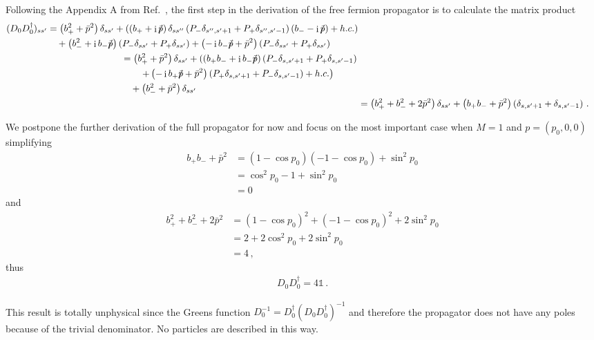 \documentclass[a4paper]{article}
\DeclareMathOperator{\im}{i}
\begin{document}
	Following the Appendix A from Ref.~\cite{hands_thirring2016}, the first step in the derivation of the free fermion propagator is to calculate the matrix product
	\begin{align}
		\begin{split}
			(D_0D_0^\dagger)_{ss'} &= \left(b_+^2+{\bar p}^2\right)\delta_{ss'}
			+ \left(\left(b_+ + \im \slashed{\bar p}\right)\delta_{ss''} \left(P_-\delta_{s'',s'+1} + P_+\delta_{s'',s'-1}\right)\left(b_- - \im \slashed{\bar p}\right) + h.c.\right)\\
			&\quad + \left(b_-^2+\im b_-\slashed{\bar p}\right)\left(P_-\delta_{ss'}+P_+\delta_{ss'}\right) + \left(-\im b_-\slashed{\bar p}+{\bar p}^2\right)\left(P_-\delta_{ss'}+P_+\delta_{ss'}\right)
		\end{split}\\
		\begin{split}
			&= \left(b_+^2+{\bar p}^2\right)\delta_{ss'}
			+ \left(\left(b_+b_- + \im b_- \slashed{\bar p}\right)\left(P_-\delta_{s,s'+1} + P_+\delta_{s,s'-1}\right)\right.\\
			&\qquad \left.+ \left(- \im b_+ \slashed{\bar p} + {\bar p}^2\right)\left(P_+\delta_{s,s'+1} + P_-\delta_{s,s'-1}\right) + h.c.\right)\\
			&\quad + \left(b_-^2+{\bar p}^2\right)\delta_{ss'}
		\end{split}\\
		&= \left(b_+^2+b_-^2+2\bar p^2\right)\delta_{ss'} + \left(b_+b_- + {\bar p}^2\right)\left(\delta_{s,s'+1} + \delta_{s,s'-1}\right)\,.
	\end{align}

	We postpone the further derivation of the full propagator for now and focus on the most important case when $M=1$ and $p=(p_0,0,0)$ simplifying
	\begin{align}
		b_+b_- + {\bar p}^2 &= (1-\cos p_0)(-1-\cos p_0) + \sin^2 p_0\\
		&= \cos^2 p_0 - 1 + \sin^2 p_0\\
		&= 0
	\end{align}
	and
	\begin{align}
		b_+^2+b_-^2+2\bar p^2 &= (1-\cos p_0)^2 + (-1-\cos p_0)^2 + 2\sin^2 p_0\\
		&= 2 + 2\cos^2 p_0 + 2\sin^2 p_0\\
		&= 4\,,
	\end{align}
	thus
	\begin{align}
		D_0D_0^\dagger = 4 \mathds{1}\,.
	\end{align}

	This result is totally unphysical since the Greens function $D_0^{-1}=D_0^\dagger(D_0D_0^\dagger)^{-1}$ and therefore the propagator does not have any poles because of the trivial denominator. No particles are described in this way.
	
	\clearpage
	\printbibliography
\end{document}

